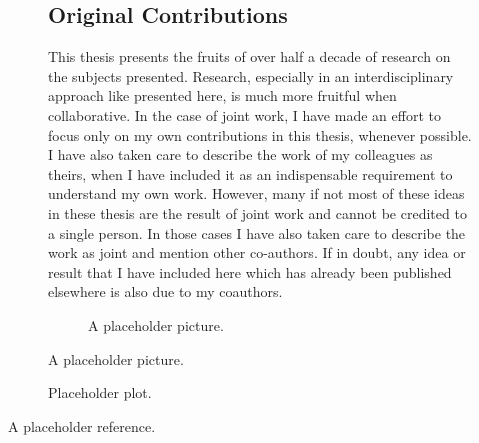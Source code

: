 \begin{figure}[h]
\subsection*{Original Contributions}
This thesis presents the fruits of over half a decade of research on the subjects presented. Research, especially in an interdisciplinary approach like presented here, is much more fruitful when collaborative.
In the case of joint work, I have made an effort to focus only on my own contributions in this thesis, whenever possible.
I have also taken care to describe the work of my colleagues as theirs, when I have included it as an indispensable requirement to understand my own work.
However,  many if not most of these ideas in these thesis are the result of joint work and cannot be credited to a single person.
In those cases I have also taken care to describe the work as joint and mention other co-authors.
If in doubt, any idea or result that I have included here which has already been published elsewhere is also due to my coauthors.

\begin{figure}[h]
	\centering
   \resizebox{0.55\textwidth}{!}{}
	\caption{A placeholder picture.}
	\label{fig:placeholder}
\end{figure}

\end{figure}
\begin{figure}[h]
	\centering
   \resizebox{0.55\textwidth}{!}{}
	\caption{Placeholder plot.} %
	\label{fig:placeholder_plot}
\end{figure}

A placeholder reference\cite{goens_multiprog18}.

